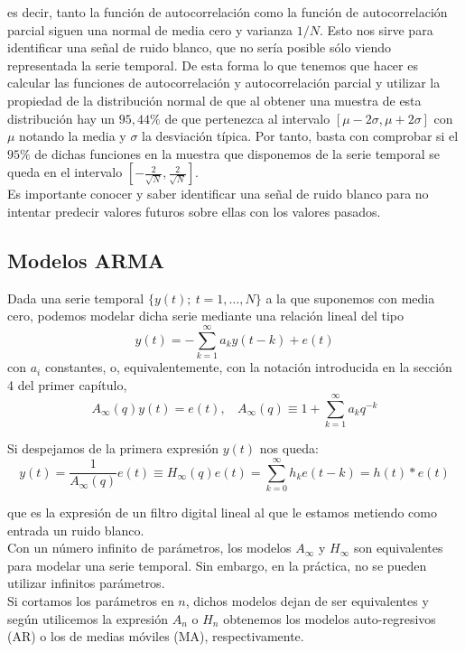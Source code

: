 es decir, tanto la función de autocorrelación como la función de autocorrelación parcial siguen una normal de media cero y varianza $1/N$. Esto nos sirve para identificar una señal de ruido blanco, que no sería posible sólo viendo representada la serie temporal. De esta forma lo que tenemos que hacer es calcular las funciones de autocorrelación y autocorrelación parcial y utilizar la propiedad de la distribución normal de que al obtener una muestra de esta distribución hay un $95,44\%$ de que pertenezca al intervalo $[\mu - 2 \sigma, \mu + 2 \sigma]$ con $\mu$ notando la media y $\sigma$ la desviación típica. Por tanto, basta con comprobar si el $95\%$ de dichas funciones en la muestra que disponemos de la serie temporal se queda en el intervalo $[- \frac{2}{\sqrt{N}}, \frac{2}{\sqrt{N}}]$.\\

Es importante conocer y saber identificar una señal de ruido blanco para no intentar predecir valores futuros sobre ellas con los valores pasados.

\subsection{Modelos ARMA}

Dada una serie temporal $\{y(t);\ t=1,\dots,N\}$ a la que suponemos con media cero, podemos modelar dicha serie mediante una relación lineal del tipo
\[	y(t) = - \sum_{k=1}^{\infty} a_k y(t-k) + e(t) \]
con $a_i$ constantes, o, equivalentemente, con la notación introducida en la sección 4 del primer capítulo,
\[	A_{\infty}(q)y(t) = e(t), \ \ \ \ A_{\infty}(q) \equiv 1 + \sum_{k=1}^{\infty} a_k q^{-k}	\]

Si despejamos de la primera expresión $y(t)$ nos queda:
\[	y(t) = \frac{1}{A_{\infty}(q)}e(t) \equiv H_{\infty}(q)e(t) = \sum_{k=0}^{\infty} h_k e(t-k) = h(t) \ast e(t)	\]

que es la expresión de un filtro digital lineal al que le estamos metiendo como entrada un ruido blanco.\\

Con un número infinito de parámetros, los modelos $A_{\infty}$ y $H_{\infty}$ son equivalentes para modelar una serie temporal. Sin embargo, en la práctica, no se pueden utilizar infinitos parámetros.\\
Si cortamos los parámetros en $n$, dichos modelos dejan de ser equivalentes y según utilicemos la expresión $A_n$ o $H_n$ obtenemos los modelos auto-regresivos (AR) o los de medias móviles (MA), respectivamente.

